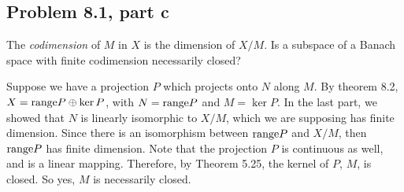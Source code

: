 \newpage
\subsection{Problem 8.1, part c}
The \textit{codimension} of $M$ in $X$ is the dimension of $X/M$. Is a subspace of a Banach space with finite codimension necessarily closed? 
\partbreak
\begin{solution}

    Suppose we have a projection $P$ which projects onto $N$ along $M$. By theorem 8.2, $X = \text{range} P \oplus \ker P$, with $N = \text{range} P$ and $M = \ker P$. In the last part, we showed that $N$ is linearly isomorphic to $X / M$, which we are supposing has finite dimension. Since there is an isomorphism between $\text{range} P$ and $X / M$, then $\text{range} P$ has finite dimension. Note that the projection $P$ is continuous as well, and is a linear mapping. Therefore, by Theorem 5.25, the kernel of $P$, $M$, is closed. So yes, $M$ is necessarily closed.  
\end{solution}

\newpage
